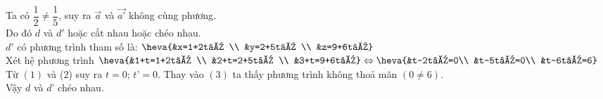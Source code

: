 \begin{bt}
{\begin{enumerate}
			Ta có $\dfrac{1}{2}\ne \dfrac{1}{5}$, suy ra $\overrightarrow{a}$ và $\overrightarrow{a’}$  không cùng phương.\\
			Do đó $d$ và $d'$ hoặc cắt nhau hoặc chéo nhau.\\
			${d}'$ có phương trình tham số là:
			$\heva{&x=1+2t’ \\
				&y=2+5t’ \\
				&z=9+6t’}$\\
			Xét hệ phương trình $\heva{&1+t=1+2t’ \\
				&2+t=2+5t’ \\
				&3+t=9+6t’}
				\Leftrightarrow \heva{&t-2t’=0\\
					&t-5t’=0\\
					&t-6t’=6}$\\
			Từ $(1)$ và (2) suy ra $t=0$; $t’=0$. Thay vào $(3)$ ta thấy phương trình không thoả mãn $\left( 0\ne 6 \right)$.\\
			Vậy $d$ và $d’$ chéo nhau.
		\end{enumerate}
	}
\end{bt}

